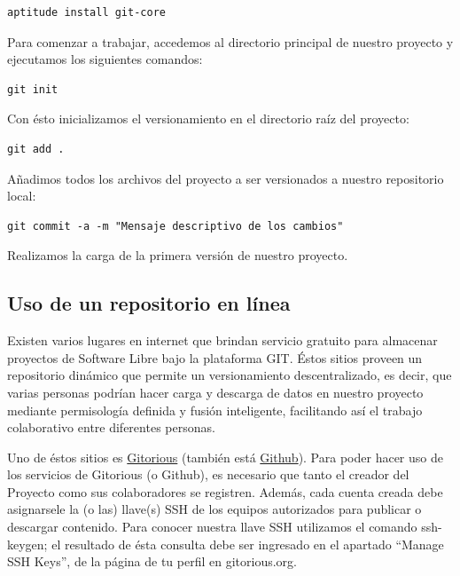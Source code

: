 \documentclass[letterpaper,12pt,spanish]{manual}
\begin{document}
\begin{Verbatim}[commandchars=@\[\]]
aptitude install git-core
\end{Verbatim}

Para comenzar a trabajar, accedemos al directorio principal de nuestro proyecto y ejecutamos los siguientes comandos:

\begin{Verbatim}[commandchars=@\[\]]
git init
\end{Verbatim}

Con ésto inicializamos el versionamiento en el directorio raíz del proyecto:

\begin{Verbatim}[commandchars=@\[\]]
git add .
\end{Verbatim}

Añadimos todos los archivos del proyecto a ser versionados a nuestro repositorio local:

\begin{Verbatim}[commandchars=@\[\]]
git commit -a -m "Mensaje descriptivo de los cambios"
\end{Verbatim}

Realizamos la carga de la primera versión de nuestro proyecto.


\subsection{Uso de un repositorio en línea}

Existen varios lugares en internet que brindan servicio gratuito para almacenar proyectos de Software Libre bajo la plataforma GIT. Éstos sitios proveen un repositorio dinámico que permite un versionamiento descentralizado, es decir, que varias personas podrían hacer carga y descarga de datos en nuestro proyecto mediante permisología definida y fusión inteligente, facilitando así el trabajo colaborativo entre diferentes personas.

Uno de éstos sitios es \href{http://gitorious.com/}{Gitorious} (también está \href{http://github.com/}{Github}). Para poder hacer uso de los servicios de Gitorious (o Github), es necesario que tanto el creador del Proyecto como sus colaboradores se registren. Además, cada cuenta creada debe asignarsele la (o las) llave(s) SSH de los equipos autorizados para publicar o descargar contenido. Para conocer nuestra llave SSH utilizamos el comando ssh-keygen; el resultado de ésta consulta debe ser ingresado en el apartado “Manage SSH Keys”, de la página de tu perfil en gitorious.org.
\end{document}
